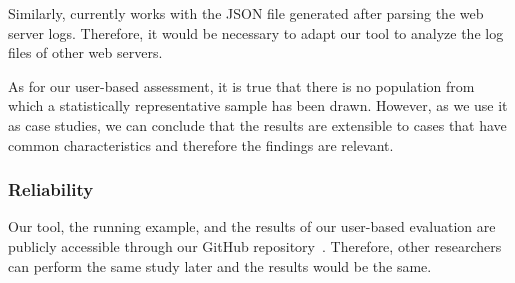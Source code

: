 Similarly, {\nameTool} currently works with the JSON file generated after parsing the web server logs. Therefore, it would be necessary to adapt our tool to analyze the log files of other web servers.

As for our user-based assessment, it is true that there is no population from which a statistically representative sample has been drawn. However, as we use it as case studies, we can conclude that the results are extensible to cases that have common characteristics and therefore the findings are relevant.

\subsubsection*{Reliability}

Our tool, the running example, and the results of our user-based evaluation are publicly accessible through our GitHub repository~\cite{links2cpn}. Therefore, other researchers can perform the same study later and the results would be the same.

